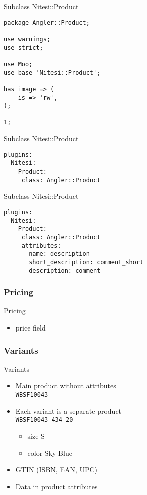 \begin{frame}[fragile]{Subclass Nitesi::Product}
\begin{lstlisting}
package Angler::Product;

use warnings;
use strict;

use Moo;
use base 'Nitesi::Product';

has image => (
    is => 'rw',
);

1;
\end{lstlisting}
\end{frame}

\begin{frame}[fragile]{Subclass Nitesi::Product}
\begin{lstlisting}
plugins:
  Nitesi:
    Product:
     class: Angler::Product
\end{lstlisting}
\end{frame}

\begin{frame}[fragile]{Subclass Nitesi::Product}
\begin{lstlisting}
plugins:
  Nitesi:
    Product:
     class: Angler::Product
     attributes:
       name: description
       short_description: comment_short
       description: comment
\end{lstlisting}
\end{frame}

\subsubsection{Pricing}
\begin{frame}{Pricing}
\begin{itemize}
\item price field
\end{itemize}
\end{frame}


\subsubsection{Variants}
\begin{frame}[fragile]{Variants}
\begin{itemize}
\item Main product without attributes \\
      \verb|WBSF10043|
\item Each variant is a separate product \\
      \verb|WBSF10043-434-20| 
\begin{itemize}
\item size S 
\item color Sky Blue
\end{itemize}
\item GTIN (ISBN, EAN, UPC)
\item Data in product attributes
\end{itemize}
\end{frame}

